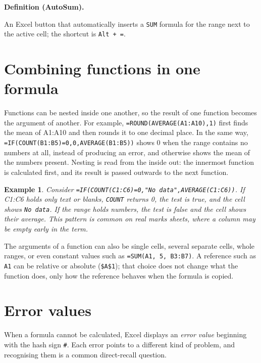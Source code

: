 \documentclass[11pt]{article}
\newtheorem{example}{Example}[section]
\newenvironment{definitionbox}[1]{%
  \par\noindent\textbf{Definition (#1).}\ \itshape
}{\par\vspace{0.3em}}
\begin{document}
\begin{definitionbox}{AutoSum}
An Excel button that automatically inserts a \texttt{SUM} formula for the
range next to the active cell; the shortcut is \texttt{Alt + =}.
\end{definitionbox}

\section{Combining functions in one formula}
Functions can be nested inside one another, so the result of one function
becomes the argument of another. For example,
\texttt{=ROUND(AVERAGE(A1:A10),1)} first finds the mean of A1:A10 and then
rounds it to one decimal place. In the same way,
\texttt{=IF(COUNT(B1:B5)=0,0,AVERAGE(B1:B5))} shows 0 when the range contains
no numbers at all, instead of producing an error, and otherwise shows the mean
of the numbers present. Nesting is read from the inside out: the innermost
function is calculated first, and its result is passed outwards to the next
function.

\begin{example}
Consider \texttt{=IF(COUNT(C1:C6)=0,"No data",AVERAGE(C1:C6))}. If C1:C6 holds
only text or blanks, \texttt{COUNT} returns 0, the test is true, and the cell
shows \texttt{No data}. If the range holds numbers, the test is false and the
cell shows their average. This pattern is common on real marks sheets, where a
column may be empty early in the term.
\end{example}

The arguments of a function can also be single cells, several separate cells,
whole ranges, or even constant values such as \texttt{=SUM(A1, 5, B3:B7)}. A
reference such as \texttt{A1} can be relative or absolute (\texttt{\$A\$1});
that choice does not change what the function does, only how the reference
behaves when the formula is copied.

\section{Error values}
When a formula cannot be calculated, Excel displays an \emph{error value}
beginning with the hash sign \texttt{\#}. Each error points to a different
kind of problem, and recognising them is a common direct-recall question.
\end{document}
